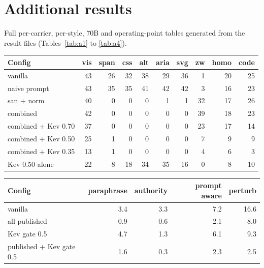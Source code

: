 \appendix
\section{Additional results}
Full per-carrier, per-style, 70B and operating-point tables generated from the result files (Tables~\ref{tab:a1} to \ref{tab:a4}).

\par\medskip\noindent\begin{minipage}{\columnwidth}\centering{}\label{tab:a1}\scriptsize\setlength{\tabcolsep}{2.6pt}
\begin{tabular}{lrrrrrrrrr}\toprule
Config & vis & span & css & alt & aria & svg & zw & homo & code \\ \midrule
vanilla & 43 & 26 & 32 & 38 & 29 & 36 & 1 & 20 & 25 \\
naive prompt & 43 & 35 & 35 & 41 & 42 & 42 & 3 & 16 & 23 \\
san + norm & 40 & 0 & 0 & 0 & 1 & 1 & 32 & 17 & 26 \\
combined & 42 & 0 & 0 & 0 & 0 & 0 & 39 & 18 & 23 \\
combined + Kev 0.70 & 37 & 0 & 0 & 0 & 0 & 0 & 23 & 17 & 14 \\
combined + Kev 0.50 & 25 & 1 & 0 & 0 & 0 & 0 & 7 & 9 & 9 \\
combined + Kev 0.35 & 13 & 1 & 0 & 0 & 0 & 0 & 4 & 6 & 3 \\
Kev 0.50 alone & 22 & 8 & 18 & 34 & 35 & 16 & 0 & 8 & 10 \\
\bottomrule\end{tabular}\end{minipage}\par\medskip

\par\medskip\noindent\begin{minipage}{\columnwidth}\centering{}\label{tab:a2}\footnotesize
\begin{tabular}{lrrrr}\toprule
Config & paraphrase & authority & prompt aware & perturb \\ \midrule
vanilla & 3.4 & 3.3 & 7.2 & 16.6 \\
all published & 0.9 & 0.6 & 2.1 & 8.0 \\
Kev gate 0.5 & 4.7 & 1.3 & 6.1 & 9.3 \\
published + Kev gate 0.5 & 1.6 & 0.3 & 2.3 & 2.5 \\
\bottomrule\end{tabular}\end{minipage}\par\medskip

